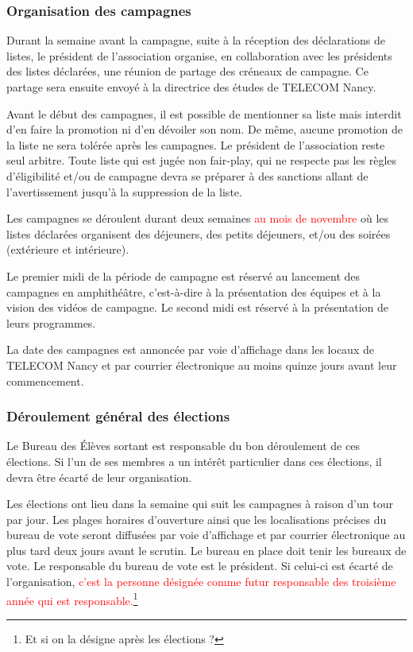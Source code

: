 \documentclass{article} %
\begin{document}
			\subsubsection{Organisation des campagnes}

				Durant la semaine avant la campagne, suite à la réception des
				déclarations de listes, le président de l’association organise,
				en collaboration avec les présidents des listes déclarées, une
				réunion de partage des créneaux de campagne. Ce partage sera
				ensuite envoyé à la directrice des études de TELECOM Nancy.

				Avant le début des campagnes, il est possible de mentionner sa
				liste mais interdit d’en faire la promotion ni d'en dévoiler son
				nom. De même, aucune promotion de la liste ne sera tolérée après
				les campagnes. Le président de l’association reste seul arbitre.
				Toute liste qui est jugée non fair-play, qui ne respecte pas les
				règles d’éligibilité et/ou de campagne devra se préparer à des
				sanctions allant de l’avertissement jusqu'à la suppression de la
				liste.

				Les campagnes se déroulent durant deux semaines
				\textcolor{red}{au mois de novembre} où les listes déclarées
				organisent des déjeuners, des petits déjeuners, et/ou des
				soirées (extérieure et intérieure).
				
				Le premier midi de la période de campagne est réservé au
				lancement des campagnes en amphithéâtre, c’est-à-dire à la
				présentation des équipes et à la vision des vidéos de campagne.
				Le second midi est réservé à la présentation de leurs
				programmes.

				La date des campagnes est annoncée par voie d’affichage dans les
				locaux de TELECOM Nancy et par courrier électronique au moins
				quinze jours avant leur commencement.

			\subsubsection{Déroulement général des élections}

				Le Bureau des Élèves sortant est responsable du bon déroulement
				de ces élections. Si l'un de ses membres a un intérêt
				particulier dans ces élections, il devra être écarté de leur
				organisation.

				Les élections ont lieu dans la semaine qui suit les campagnes à
				raison d’un tour par jour. Les plages horaires d’ouverture ainsi
				que les localisations précises du bureau de vote seront
				diffusées par voie d’affichage et par courrier électronique au
				plus tard deux jours avant le scrutin. Le bureau en place doit
				tenir les bureaux de vote. Le responsable du bureau de vote est
				le président. Si celui-ci est écarté de l’organisation,
				\textcolor{red}{c’est la personne désignée comme futur
				responsable des troisième année qui est
				responsable.}\footnote{Et si on la désigne après les élections
				?}
\end{document}
